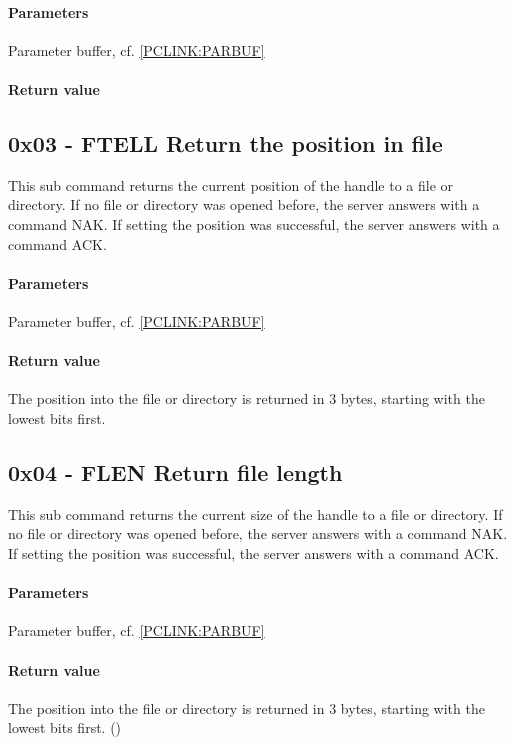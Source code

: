 \documentclass[10pt]{article}
\begin{document}
\paragraph{Parameters}
Parameter buffer, cf. \ref{PCLINK:PARBUF}

\paragraph{Return value}

\subsection{0x03 - FTELL Return the position in file }
This sub command returns the current position of the handle to a file or directory.
If no file or directory was opened before, the server answers with a command NAK.
If setting the position was successful, the server answers with a command ACK.

\paragraph{Parameters}
Parameter buffer, cf. \ref{PCLINK:PARBUF}

\paragraph{Return value}
The position into the file or directory is returned in 3 bytes, starting with the lowest bits first. 

\subsection{0x04 - FLEN Return file length }
This sub command returns the current size of the handle to a file or directory.
If no file or directory was opened before, the server answers with a command NAK.
If setting the position was successful, the server answers with a command ACK.

\paragraph{Parameters}
Parameter buffer, cf. \ref{PCLINK:PARBUF}
\paragraph{Return value}
The position into the file or directory is returned in 3 bytes, starting with the lowest bits first. ()
\end{document}
